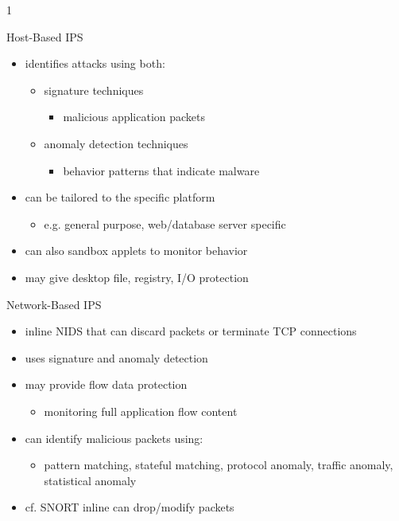 1\documentclass{beamer}
\begin{document}
\begin{frame}{Host-Based IPS}
  \begin{itemize}
  \item identifies attacks using both: 
    \begin{itemize}
    \item signature techniques 
      \begin{itemize}
      \item malicious application packets 
      \end{itemize}
    \item anomaly detection techniques 
      \begin{itemize}
      \item behavior patterns that indicate malware 
      \end{itemize}
    \end{itemize}
  \item can be tailored to the specific platform 
    \begin{itemize}
    \item e.g. general purpose, web/database server specific 
    \end{itemize}
  \item can also sandbox applets to monitor behavior 
  \item may give desktop file, registry, I/O protection
  \end{itemize}
\end{frame}

\begin{frame}{Network-Based IPS}
  \begin{itemize}
  \item inline NIDS that can discard packets or 
    terminate TCP connections 
  \item uses signature and anomaly detection 
  \item may provide flow data protection 
    \begin{itemize}
    \item monitoring full application flow content 
    \end{itemize}
  \item can identify malicious packets using: 
    \begin{itemize}
    \item pattern matching, stateful matching, protocol 
      anomaly, traffic anomaly, statistical anomaly 
    \end{itemize}
  \item cf. SNORT inline can drop/modify packets
  \end{itemize}
\end{frame}
\end{document}
